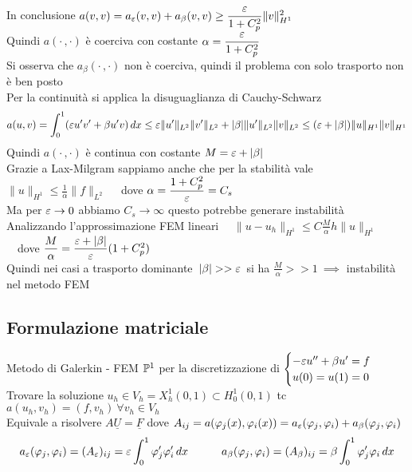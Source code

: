 \documentclass{article}
\renewcommand{\vv}[1]{\underline{#1}}
\begin{document}
In conclusione $a(v,v) = a_{\varepsilon}(v,v) + a_{\beta}(v,v) \ge \dfrac{\varepsilon}{1+C_p^2}\|v\|^2_{H^1}$\\
Quindi $a(\cdot\, , \cdot)$ è coerciva con costante $\alpha = \dfrac{\varepsilon}{1+C_p^2}$\\

Si osserva che $a_{\beta}(\cdot\, , \cdot)$ non è coerciva, quindi il problema con solo trasporto non è ben posto\\

Per la continuità si applica la disuguaglianza di Cauchy-Schwarz
\[
a(u,v)= \int_0^1 (\eps u'v' + \beta u'v)\, dx \le \eps \|u'\|_{L^2}\|v'\|_{L^2} + |\beta|\|u'\|_{L^2}\|v\|_{L^2} \le (\eps + |\beta|)\|u\|_{H^1}\|v\|_{H^1}
\]
Quindi $a(\cdot\, ,\cdot)$ è continua con costante $M=\varepsilon+|\beta|$\\





Grazie a Lax-Milgram sappiamo anche che per la stabilità vale $\|u\|_{H^1}\le \frac{1}{\alpha} \|f\|_{L^2}$ \ \ dove $\alpha=\dfrac{1+C_p^2}{\varepsilon}=C_s$\\
Ma per $\varepsilon\to 0$ abbiamo $C_s\to \infty$ questo potrebbe generare instabilità\\

Analizzando l'approssimazione FEM lineari \ \ $\|u-u_h\|_{H^1}\le C\frac{M}{\alpha}h\|u\|_{H^1}$ \ \ dove $\dfrac{M}{\alpha}=\dfrac{\varepsilon+|\beta|}{\varepsilon}(1+C_p^2)$\\
Quindi nei casi a trasporto dominante\, $|\beta|>> \eps$\, si ha $\frac{M}{\alpha}>>1  \ \implies$ instabilità nel metodo FEM\\

\subsection{Formulazione matriciale}

Metodo di Galerkin - FEM $\mathbb P^1$ per la discretizzazione di $\begin{cases}
    -\varepsilon u'' + \beta u' = f\\
    u(0)=u(1)=0
\end{cases}$\\
Trovare la soluzione $u_h\in V_h = X_h^1(0,1)\subset H_0^1(0,1)$ tc $a(u_h,v_h)=(f,v_h) \ \forall v_h\in V_h$\\
Equivale a risolvere $A\vv{U}=\vv{F}$ dove $A_{ij}=a(\varphi_j(x),\varphi_i(x))=a_{\varepsilon}(\varphi_j,\varphi_i) + a_{\beta}(\varphi_j,\varphi_i)$
\[a_{\eps}(\phi_j,\phi_i)=(A_{\eps})_{ij} = \eps \int_0^1 \phi_j'\phi_i'\, dx \hspace{30pt} a_{\beta}(\phi_j,\phi_i)= (A_{\beta})_{ij} = \beta \int_0^1 \phi_j'\phi_i\, dx \]
\phantom{}
\end{document}
